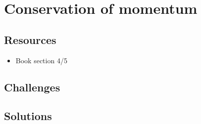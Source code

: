 \newpage
\section{Conservation of momentum}

\subsection*{Resources}
\begin{itemize}
    \item Book section 4/5
\end{itemize}

\subsection*{Challenges}

\subsection*{Solutions}
\fi

